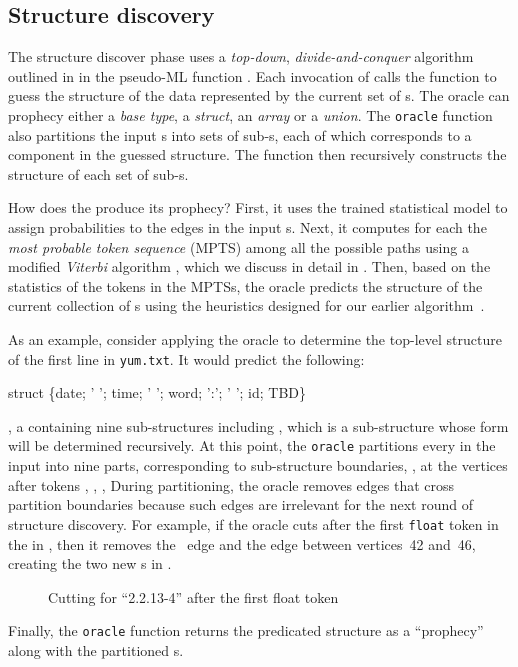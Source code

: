 \subsection{Structure discovery}
The structure discover phase uses a {\em top-down}, {\em
divide-and-conquer} algorithm outlined in 
 in the pseudo-ML function
.  Each invocation of 
calls the  function to guess the structure of the data represented
by the current set of \seqset{}s.  The oracle can prophecy
either a {\em base type}, a {\em struct}, an {\em array} or a {\em union}.
The {\tt oracle} function also partitions the input \seqset{}s into
sets of sub-\seqset{}s, each of which corresponds to a component in
the guessed structure.  The  function then recursively 
constructs the structure of each set of sub-\seqset{}s.

How does the  produce its prophecy?
First, it uses the trained statistical model to assign probabilities
to the edges in the input \seqset{}s.
Next, it computes for each \seqset{} the {\em most probable token
sequence} (MPTS) among all the possible paths 
using a modified {\em Viterbi} algorithm \cite{rabiner89:hmm},
which we discuss in detail in .
Then, based on the statistics of the tokens in the MPTSs,
the oracle predicts the structure of the current collection of
\seqset{}s using the heuristics designed for our earlier
algorithm~\cite{fisher+:dirttoshovels}. 

As an example, consider applying the oracle to determine the top-level
structure of the first line in \texttt{yum.txt}.  It would predict the
following: 
\begin{centercode}
struct \{date;  ' '; time; ' '; word; ':'; ' '; id; TBD\}
\end{centercode}
\ie{}, a  containing nine sub-structures including , which is
a sub-structure whose form will be determined recursively.
At this point, the {\tt oracle} partitions
every \seqset{} in the input into nine parts, corresponding to
sub-structure boundaries,
\ie{}, at the vertices after tokens , , ,
\etc{}
During partitioning, the oracle removes \seqset{} edges that cross partition
boundaries because such edges are irrelevant for the next round
of structure discovery.
For example, if the oracle cuts after the first {\tt float} token in the \seqset{}
in , then it removes the ~edge and the  edge between
vertices~42 and~46, creating the two new \seqset{}s in .
%
\begin{figure}[th]
\begin{center}
\end{center}
\caption{Cutting \seqset{} for ``2.2.13-4'' after the first float token} \label{fig:cut}
\end{figure}
%
Finally, the {\tt oracle} function returns the predicated structure as a ``prophecy''
along with the partitioned \seqset{}s. 

